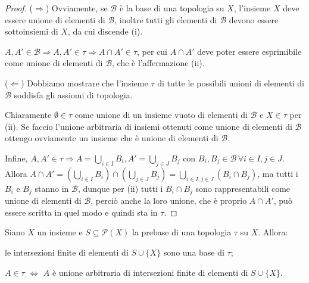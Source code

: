 \documentclass{article}
\begin{document}
\begin{proof} \label{prop:preb}
    ($\Rightarrow$) Ovviamente, se $\mathcal{B}$ è la base di una topologia su
    $X$, l'insieme $X$ deve essere unione di elementi di $\mathcal{B}$, inoltre
    tutti gli elementi di $\mathcal{B}$ devono essere sottoinsiemi di $X$, da
    cui discende (i).

	$A, A' \in \mathcal{B} \Rightarrow A, A' \in \tau \Rightarrow A \cap A' \in
	\tau$, per cui $A \cap A'$ deve poter essere esprimibile come unione di
	elementi di $\mathcal{B}$, che è l'affermazione (ii).

	($\Leftarrow$) Dobbiamo mostrare che l'insieme $\tau$ di tutte le possibili
	unioni di elementi di $\mathcal{B}$ soddisfa gli assiomi di topologia.

	Chiaramente $\emptyset \in \tau$ come unione di un insieme vuoto di elementi
	di $\mathcal{B}$ e $X \in \tau$ per (ii).  Se faccio l'unione arbitraria di
	insiemi ottenuti come unione di elementi di $\mathcal{B}$ ottengo ovviamente
	un insieme che è unione di elementi di $\mathcal{B}$.

	Infine, $\displaystyle A, A' \in \tau \Rightarrow A=\bigcup_{i \in I} B_i,
	A'=\bigcup_{j \in J} B_j$ con $B_i, B_j \in \mathcal{B} \, \forall i \in I,
	j \in J$. Allora $\displaystyle A \cap A'= \left(\bigcup_{i \in I} B_i
	\right) \cap \left(\bigcup_{j \in J} B_j \right)=\bigcup_{i \in I, j \in J}
	(B_i \cap B_j)$, ma tutti i $B_i$ e $B_j$ stanno in $\mathcal{B}$, dunque
	per (ii) tutti i $B_i \cap B_j$ sono rappresentabili come unione di elementi
	di $\mathcal{B}$, perciò anche la loro unione, che è proprio $A \cap A'$,
	può essere scritta in quel modo e quindi sta in $\tau$.
\end{proof}

\begin{prop}
	Siano $X$ un insieme e $S \subseteq \mathcal{P}(X)$ la prebase di una
	topologia $\tau$ su $X$. Allora:
	\begin{nlist}
		\item le intersezioni finite di elementi di $S \cup \{X\}$ sono una base
		di $\tau$;
		\item $A \in \tau$ $\Leftrightarrow$ $A$ è unione arbitraria di
		intersezioni finite di elementi di $S \cup \{X\}$.
	\end{nlist}
\end{prop}
\end{document}
